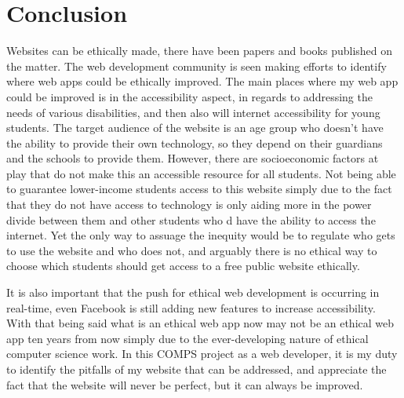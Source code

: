 \documentclass[10pt,twocolumn]{article}
\begin{document}
\section{Conclusion}
Websites can be ethically made, there have been papers and books published on the matter. The web development community is seen making efforts to identify where web apps could be ethically improved. The main places where my web app could be improved is in the accessibility aspect, in regards to addressing the needs of various disabilities, and then also will internet accessibility for young students. The target audience of the website is an age group who doesn't have the ability to provide their own technology, so they depend on their guardians and the schools to provide them. However, there are socioeconomic factors at play that do not make this an accessible resource for all students. Not being able to guarantee lower-income students access to this website simply due to the fact that they do not have access to technology is only aiding more in the power divide between them and other students who d have the ability to access the internet. Yet the only way to assuage the inequity would be to regulate who gets to use the website and who does not, and arguably there is no ethical way to choose which students should get access to a free public website ethically.  

It is also important that the push for ethical web development is occurring in real-time, even Facebook is still adding new features to increase accessibility. With that being said what is an ethical web app now may not be an ethical web app ten years from now simply due to the ever-developing nature of ethical computer science work. In this COMPS project as a web developer, it is my duty to identify the pitfalls of my website that can be addressed, and appreciate the fact that the website will never be perfect, but it can always be improved.

\printbibliography 
\end{document}
